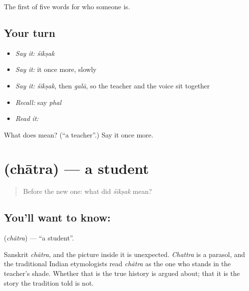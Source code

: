 \begin{grammarlens}[title={What you've built}]
The first of five words for who someone is.
\end{grammarlens}

\subsection*{Your turn}
\begin{itemize}
\raggedright
  \item \emph{Say it:} \emph{śikṣak}
  \item \emph{Say it:} it once more, slowly
  \item \emph{Say it:} \emph{śikṣak}, then \emph{galā}, so the teacher and the voice sit together
  \item \emph{Recall:} say \emph{phal}
  \item \emph{Read it:} \textbf{}
\end{itemize}

\begin{tcolorbox}[breakable,colback=teal!4,colframe=teal!35!black,title={Before you move on}]
What does  mean? (\textquotedblleft{}a teacher\textquotedblright{}.) Say it once more.
\end{tcolorbox}
\section[\texorpdfstring{\hi{छात्र} (chātra)}{छात्र (chātra)}]{ (chātra) — a student}

\label{lesson:HI-C47-student}



\begin{quote}
Before the new one: what did \emph{śikṣak} mean?
\end{quote}

\subsection*{You'll want to know: }
\textbf{} (\emph{chātra}) — \textquotedblleft{}a student\textquotedblright{}.

Sanskrit \emph{chātra}, and the picture inside it is unexpected. \emph{Chattra} is a parasol, and the traditional Indian etymologists read \emph{chātra} as the one who stands in the teacher's shade. Whether that is the true history is argued about; that it is the story the tradition told is not.

